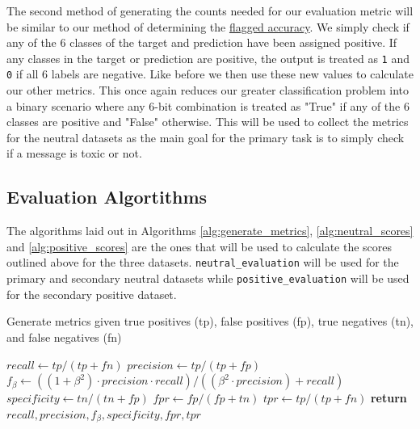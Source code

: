 The second method of generating the counts needed for our evaluation metric will be similar to our method of determining the \hyperref[flag_acc]{flagged accuracy}. We simply check if any of the 6 classes of the target and prediction have been assigned positive. If any classes in the target or prediction are positive, the output is treated as \verb|1| and \verb|0| if all 6 labels are negative. Like before we then use these new values to calculate our other metrics. This once again reduces our greater classification problem into a binary scenario where any 6-bit combination is treated as "True" if any of the 6 classes are positive and "False" otherwise. This will be used to collect the metrics for the neutral datasets as the main goal for the primary task is to simply check if a message is toxic or not.

\subsection{Evaluation Algortithms}

The algorithms laid out in Algorithms \ref{alg:generate_metrics}, \ref{alg:neutral_scores} and \ref{alg:positive_scores} are the ones that will be used to calculate the scores outlined above for the three datasets. \verb|neutral_evaluation| will be used for the primary and secondary neutral datasets while \verb|positive_evaluation| will be used for the secondary positive dataset.

\begin{algorithm}[H]
    \caption{Generate metrics given true positives (tp), false positives (fp), true negatives (tn), and false negatives (fn)}
    \begin{algorithmic}[1]
        \State $recall \gets tp / (tp + fn)$ 
        \State $precision \gets tp / (tp + fp)$ 
        \State $f_{\beta} \gets ((1 + \beta^2) \cdot precision \cdot recall) / ((\beta^2 \cdot precision) + recall)$ 
        \State $specificity \gets tn / (tn + fp)$ 
        \State
        \State $fpr \gets fp / (fp + tn)$ 
        \State $tpr \gets tp / (tp + fn)$
        \State
        \State \textbf{return} $recall, precision, f_{\beta}, specificity, fpr, tpr$
        \EndFunction
    \end{algorithmic}
    \label{alg:generate_metrics}
\end{algorithm}


